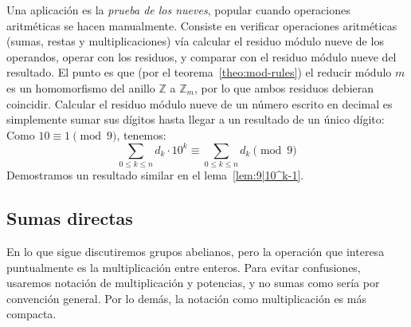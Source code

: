   Una aplicación es la \emph{prueba de los nueves},
  popular cuando operaciones aritméticas se hacen manualmente.
  Consiste en verificar operaciones aritméticas
  (sumas, restas y multiplicaciones)
  vía calcular el residuo módulo nueve de los operandos,
  operar con los residuos,
  y comparar con el residuo módulo nueve del resultado.
  El punto es que
  (por el teorema~\ref{theo:mod-rules})
  el reducir módulo \(m\) es un homomorfismo
  del anillo \(\mathbb{Z}\) a \(\mathbb{Z}_m\),%
  por lo que ambos residuos debieran coincidir.
  Calcular el residuo módulo nueve de un número escrito en decimal
  es simplemente sumar sus dígitos
  hasta llegar a un resultado de un único dígito:
  Como \(10 \equiv 1 \pmod{9}\),
  tenemos:
  \begin{equation*}
    \sum_{0 \le k \le n} d_k \cdot 10^k
      \equiv \sum_{0 \le k \le n} d_k \pmod{9}
  \end{equation*}
  Demostramos un resultado similar en el lema~\ref{lem:9|10^k-1}.

\subsection{Sumas directas}
\label{sec:sumas-directas}

  En lo que sigue discutiremos grupos abelianos,
  pero la operación que interesa puntualmente
  es la multiplicación entre enteros.
  Para evitar confusiones,
  usaremos notación de multiplicación y potencias,
  y no sumas como sería por convención general.
  Por lo demás,
  la notación como multiplicación es más compacta.

